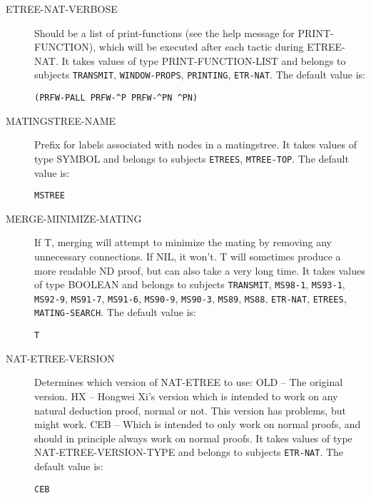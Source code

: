 \begin{description} 
\item[ETREE-NAT-VERBOSE]  
Should be a list of print-functions (see the help message 
for PRINT-FUNCTION), which will be executed after each tactic during
ETREE-NAT.
It takes values of type PRINT-FUNCTION-LIST and belongs to subjects \texttt{TRANSMIT}, \texttt{WINDOW-PROPS}, \texttt{PRINTING}, \texttt{ETR-NAT}.  The default value is: \begin{lstlisting}
(PRFW-PALL PRFW-^P PRFW-^PN ^PN)
\end{lstlisting}

\item[MATINGSTREE-NAME]  
Prefix for labels associated with nodes in a matingstree.
It takes values of type SYMBOL and belongs to subjects \texttt{ETREES}, \texttt{MTREE-TOP}.  The default value is: \begin{lstlisting}
MSTREE
\end{lstlisting}

\item[MERGE-MINIMIZE-MATING]  
If T, merging will attempt to minimize the mating
by removing any unnecessary connections. If NIL, it won't.
T will sometimes produce a more readable ND proof, but can
also take a very long time.
It takes values of type BOOLEAN and belongs to subjects \texttt{TRANSMIT}, \texttt{MS98-1}, \texttt{MS93-1}, \texttt{MS92-9}, \texttt{MS91-7}, \texttt{MS91-6}, \texttt{MS90-9}, \texttt{MS90-3}, \texttt{MS89}, \texttt{MS88}, \texttt{ETR-NAT}, \texttt{ETREES}, \texttt{MATING-SEARCH}.  The default value is: \begin{lstlisting}
T
\end{lstlisting}

\item[NAT-ETREE-VERSION]  
Determines which version of NAT-ETREE to use:
OLD -- The original version.
HX  -- Hongwei Xi's version which is intended to work on
       any natural deduction proof, normal or not.  This
       version has problems, but might work.
CEB -- Which is intended to only work on normal proofs,
       and should in principle always work on normal proofs.
It takes values of type NAT-ETREE-VERSION-TYPE and belongs to subjects \texttt{ETR-NAT}.  The default value is: \begin{lstlisting}
CEB
\end{lstlisting}


\end{description}
